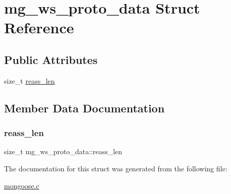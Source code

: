 \hypertarget{structmg__ws__proto__data}{}\section{mg\+\_\+ws\+\_\+proto\+\_\+data Struct Reference}
\label{structmg__ws__proto__data}
\subsection*{Public Attributes}
\begin{DoxyCompactItemize}
\item 
size\+\_\+t \hyperlink{structmg__ws__proto__data_abde1bef4413f8b6917e4da944e47447c_abde1bef4413f8b6917e4da944e47447c}{reass\+\_\+len}
\end{DoxyCompactItemize}


\subsection{Member Data Documentation}
\mbox{\label{structmg__ws__proto__data_abde1bef4413f8b6917e4da944e47447c_abde1bef4413f8b6917e4da944e47447c}} 
\subsubsection{\texorpdfstring{reass\+\_\+len}{reass\_len}}
{\footnotesize\ttfamily size\+\_\+t mg\+\_\+ws\+\_\+proto\+\_\+data\+::reass\+\_\+len}



The documentation for this struct was generated from the following file\+:\begin{DoxyCompactItemize}
\item 
\hyperlink{mongoose_8c}{mongoose.\+c}\end{DoxyCompactItemize}
